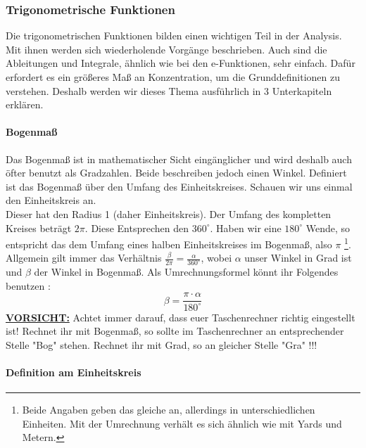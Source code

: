 	\subsubsection{Trigonometrische Funktionen}
Die trigonometrischen Funktionen bilden einen wichtigen Teil in der Analysis. Mit ihnen werden sich wiederholende Vorgänge beschrieben. Auch sind die Ableitungen und Integrale, ähnlich wie bei den e-Funktionen, sehr einfach. Dafür erfordert es ein größeres Maß an Konzentration, um die Grunddefinitionen zu verstehen. Deshalb werden wir dieses Thema ausführlich in 3 Unterkapiteln erklären.
	\paragraph{Bogenmaß}
Das Bogenmaß ist in mathematischer Sicht eingänglicher und wird deshalb auch öfter benutzt als Gradzahlen. Beide beschreiben jedoch einen Winkel. Definiert ist das Bogenmaß über den Umfang des Einheitskreises. Schauen wir uns einmal den Einheitskreis an.\\
Dieser hat den Radius 1 (daher Einheitskreis). Der Umfang des kompletten Kreises beträgt \(2\pi\). Diese Entsprechen den \(360^\circ\). Haben wir eine \(180^\circ\) Wende, so entspricht das dem Umfang eines halben Einheitskreises im Bogenmaß, also \(\pi\) \footnote{Beide Angaben geben das gleiche an, allerdings in unterschiedlichen Einheiten. Mit der Umrechnung verhält es sich ähnlich wie mit Yards und Metern.}. Allgemein gilt immer das Verhältnis \(\frac{\beta}{2\pi}=\frac{\alpha}{360^\circ}\), wobei \(\alpha\) unser Winkel in Grad ist und \(\beta\) der Winkel in Bogenmaß. Als Umrechnungsformel könnt ihr Folgendes benutzen :
\[\beta=\frac{\pi \cdot \alpha}{180^\circ}\]
\underline{\textbf{VORSICHT:}} Achtet immer darauf, dass euer Taschenrechner richtig eingestellt ist! Rechnet ihr mit Bogenmaß, so sollte im Taschenrechner an entsprechender Stelle "Bog" stehen. Rechnet ihr mit Grad, so an gleicher Stelle "Gra" !!!
	\paragraph{Definition am Einheitskreis}
	   
